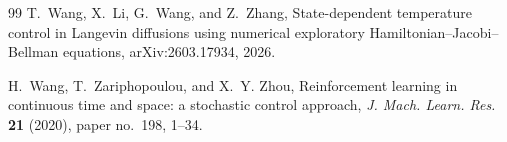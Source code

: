 \documentclass[11pt]{article}
\theoremstyle{definition}
\theoremstyle{remark}
\numberwithin{equation}{section}
\begin{document}
\begin{thebibliography}{99}
T.~Wang, X.~Li, G.~Wang, and Z.~Zhang,
\newblock State-dependent temperature control in Langevin diffusions using numerical exploratory Hamiltonian--Jacobi--Bellman equations,
\newblock arXiv:2603.17934, 2026.

H.~Wang, T.~Zariphopoulou, and X.~Y. Zhou,
\newblock Reinforcement learning in continuous time and space: a stochastic control approach,
\newblock \emph{J. Mach. Learn. Res.} \textbf{21} (2020), paper no.~198, 1--34.

\end{thebibliography}
\end{document}
